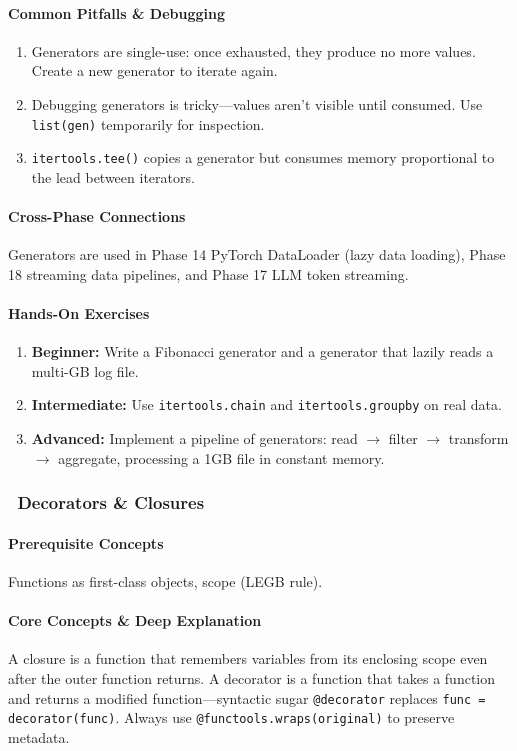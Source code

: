 \documentclass[11pt, a4paper, oneside]{report}
\newcommand{\mustmaster}[1]{\subsubsection{\texorpdfstring{\fcolorbox{blue!40!black}{blue!8}{\footnotesize\bfseries\color{blue!40!black} MUST MASTER}~#1}{#1}}}
\newcommand{\arrow}{$\rightarrow$}
\begin{document}
\paragraph{Common Pitfalls \& Debugging}
\begin{enumerate}[leftmargin=*]
\item Generators are single-use: once exhausted, they produce no more values. Create a new generator to iterate again.
\item Debugging generators is tricky---values aren't visible until consumed. Use \texttt{list(gen)} temporarily for inspection.
\item \texttt{itertools.tee()} copies a generator but consumes memory proportional to the lead between iterators.
\end{enumerate}

\paragraph{Cross-Phase Connections} Generators are used in Phase 14 PyTorch DataLoader (lazy data loading), Phase 18 streaming data pipelines, and Phase 17 LLM token streaming.

\paragraph{Hands-On Exercises}
\begin{enumerate}[leftmargin=*]
\item \textbf{Beginner:} Write a Fibonacci generator and a generator that lazily reads a multi-GB log file.
\item \textbf{Intermediate:} Use \texttt{itertools.chain} and \texttt{itertools.groupby} on real data.
\item \textbf{Advanced:} Implement a pipeline of generators: read \arrow{} filter \arrow{} transform \arrow{} aggregate, processing a 1GB file in constant memory.
\end{enumerate}

\mustmaster{Decorators \& Closures}

\paragraph{Prerequisite Concepts} Functions as first-class objects, scope (LEGB rule).

\paragraph{Core Concepts \& Deep Explanation} A closure is a function that remembers variables from its enclosing scope even after the outer function returns. A decorator is a function that takes a function and returns a modified function---syntactic sugar \texttt{@decorator} replaces \texttt{func = decorator(func)}. Always use \texttt{@functools.wraps(original)} to preserve metadata.
\end{document}
